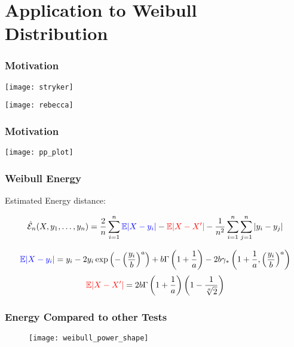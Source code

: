 \documentclass[presentation]{beamer}
\newenvironment{Figure}
{\par\medskip\noindent\minipage{\linewidth}}
{\endminipage\par\medskip}
\begin{document}
\section{Application to Weibull Distribution}

\begin{frame}
  \frametitle{Motivation}
  \begin{Figure}
    \centering
    \texttt{[image: stryker]}
  \end{Figure}
\end{frame}

\begin{frame}
  \texttt{[image: rebecca]}
\end{frame}

\begin{frame}
  \frametitle{Motivation}
  \begin{Figure}
    \centering
    \texttt{[image: pp\_plot]}
  \end{Figure}
\end{frame}

\begin{frame}
  \frametitle{Weibull Energy}
  \begin{block}{Estimated Energy distance:}
    \begin{center}
      $$\hat{\mathcal{E}}_n(X, y_1, \ldots, y_n) = \frac{2}{n} \sum_{i=1}^n \textcolor{blue}{\mathbb{E}|X - y_i|}  - \textcolor{red}{\mathbb{E}|X - X'|}  - \frac{1}{n^2} \sum_{i=1}^n \sum_{j=1}^n |y_i - y_j|$$
    \end{center}
  \end{block}  
  \begin{displaymath}
    \textcolor{blue}{\mathbb{E}|X-y_i|} = y_i - 2y_i \exp\left( - \left(\frac{y_i}{b}\right)^a \right) + b
    \Gamma \left(1 + \frac{1}{a}\right) -2b \gamma_{*} \left(1 + \frac{1}{a}, \left( \frac{y_i}{b} \right)^a\right)
  \end{displaymath}
  \vskip 0.5in
  \begin{displaymath}
    \textcolor{red}{\mathbb{E}|X - X'|} = 2b\Gamma \left( 1 + \frac{1}{a} \right)
    \left( 1 - \frac{1}{\sqrt[a]{2}} \right)
  \end{displaymath}
\end{frame}

\begin{frame}
  \frametitle{Energy Compared to other Tests}
  \begin{figure}
    \centering
    \texttt{[image: weibull\_power\_shape]}
  \end{figure}
\end{frame}
\end{document}
